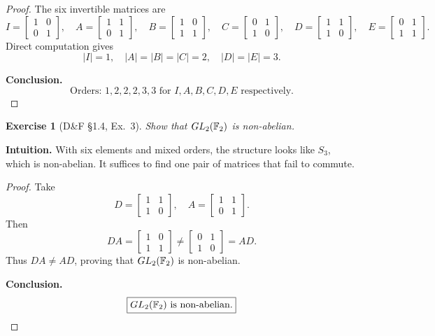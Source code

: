 \documentclass[12pt]{article}
\newtheorem{exercise}[theorem]{Exercise}
\theoremstyle{definition}
\begin{document}
\begin{proof}
The six invertible matrices are
\[
I=\begin{bmatrix}1&0\\0&1\end{bmatrix},\quad
A=\begin{bmatrix}1&1\\0&1\end{bmatrix},\quad
B=\begin{bmatrix}1&0\\1&1\end{bmatrix},\quad
C=\begin{bmatrix}0&1\\1&0\end{bmatrix},\quad
D=\begin{bmatrix}1&1\\1&0\end{bmatrix},\quad
E=\begin{bmatrix}0&1\\1&1\end{bmatrix}.
\]
Direct computation gives
\[
|I|=1,\quad |A|=|B|=|C|=2,\quad |D|=|E|=3.
\]

\smallskip
\noindent\textbf{Conclusion.}
\[
\boxed{\text{Orders: }1,2,2,2,3,3\text{ for }I,A,B,C,D,E\text{ respectively.}}
\]
\end{proof}

\newpage

\begin{exercise}[D\&F §1.4, Ex.~3]
Show that $GL_2(\Bbb F_2)$ is non-abelian.
\end{exercise}

\dotfill

\noindent\textbf{Intuition.}
With six elements and mixed orders, the structure looks like $S_3$, which is non-abelian.
It suffices to find one pair of matrices that fail to commute.

\dotfill

\begin{proof}
Take
\[
D=\begin{bmatrix}1&1\\1&0\end{bmatrix},\quad
A=\begin{bmatrix}1&1\\0&1\end{bmatrix}.
\]
Then
\[
DA=\begin{bmatrix}1&0\\1&1\end{bmatrix}\neq
\begin{bmatrix}0&1\\1&0\end{bmatrix}=AD.
\]
Thus $DA\ne AD$, proving that $GL_2(\Bbb F_2)$ is non-abelian.

\smallskip
\noindent\textbf{Conclusion.}
\[
\boxed{GL_2(\Bbb F_2)\text{ is non-abelian.}}
\]
\end{proof}
\end{document}
